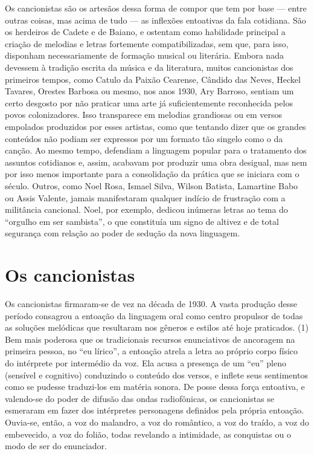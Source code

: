Os cancionistas são os artesãos dessa forma de compor que tem por base
--- entre outras coisas, mas acima de tudo --- as inflexões entoativas
da fala cotidiana. São os herdeiros de Cadete e de Baiano, e ostentam
como habilidade principal a criação de melodias e letras fortemente
compatibilizadas, sem que, para isso, disponham necessariamente de
formação musical ou literária. Embora nada devessem à tradição escrita
da música e da literatura, muitos cancionistas dos primeiros tempos,
como Catulo da Paixão Cearense, Cândido das Neves, Heckel Tavares,
Orestes Barbosa ou mesmo, nos anos 1930, Ary Barroso, sentiam um certo
desgosto por não praticar uma arte já suficientemente reconhecida pelos
povos colonizadores. Isso transparece em melodias grandiosas ou em
versos empolados produzidos por esses artistas, como que tentando dizer
que os grandes conteúdos não podiam ser expressos por um formato tão
singelo como o da canção. Ao mesmo tempo, defendiam a linguagem popular
para o tratamento dos assuntos cotidianos e, assim, acabavam por
produzir uma obra desigual, mas nem por isso menos importante para a
consolidação da prática que se iniciara com o século. Outros, como Noel
Rosa, Ismael Silva, Wilson Batista, Lamartine Babo ou Assis Valente,
jamais manifestaram qualquer indício de frustração com a militância
cancional. Noel, por exemplo, dedicou inúmeras letras ao tema do
``orgulho em ser sambista'', o que constituía um signo de altivez e de
total segurança com relação ao poder de sedução da nova linguagem.

\section{Os cancionistas}

Os cancionistas firmaram-se de vez na década de 1930. A vasta produção
desse período consagrou a entoação da linguagem oral como centro
propulsor de todas as soluções melódicas que resultaram nos gêneros e
estilos até hoje praticados. (1) Bem mais poderosa que os tradicionais
recursos enunciativos de ancoragem na primeira pessoa, no ``eu lírico'',
a entoação atrela a letra ao próprio corpo físico do intérprete por
intermédio da voz. Ela acusa a presença de um ``eu'' pleno (sensível e
cognitivo) conduzindo o conteúdo dos versos, e inflete seus sentimentos
como se pudesse traduzi-los em matéria sonora. De posse dessa força
entoativa, e valendo-se do poder de difusão das ondas radiofônicas, os
cancionistas se esmeraram em fazer dos intérpretes personagens definidos
pela própria entoação. Ouvia-se, então, a voz do malandro, a voz do
romântico, a voz do traído, a voz do embevecido, a voz do folião, todas
revelando a intimidade, as conquistas ou o modo de ser do enunciador.

